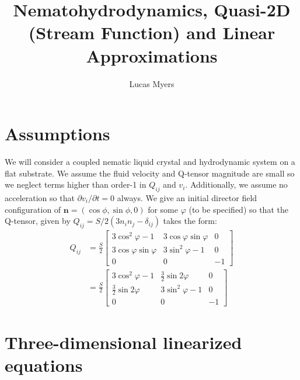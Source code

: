 \documentclass[reqno]{article}
\begin{document}
	\title{Nematohydrodynamics, Quasi-2D (Stream Function) and Linear Approximations}
	\author{Lucas Myers}
	\maketitle
	
	\section*{Assumptions}
	We will consider a coupled nematic liquid crystal and hydrodynamic system on a flat substrate. We assume the fluid velocity and Q-tensor magnitude are small so we neglect terms higher than order-1 in $Q_{ij}$ and $v_i$. Additionally, we assume no acceleration so that $\partial v_i/\partial t = 0$ always. We give an initial director field configuration of $\mathbf{n} = (\cos\phi, \sin\phi, 0)$ for some $\varphi$ (to be specified) so that the Q-tensor, given by $Q_{ij} = S/2(3n_i n_j - \delta_{ij})$ takes the form:
	\begin{align}
		Q_{ij} &= \frac{S}{2}\left[
			\begin{matrix}
				3\cos^2\varphi - 1 & 3\cos\varphi\sin\varphi & 0 \\
				3\cos\varphi\sin\varphi & 3\sin^2\varphi - 1 & 0 \\
				0 & 0 & -1
			\end{matrix}
		\right]\\
		&= \frac{S}{2}\left[
			\begin{matrix}
				3\cos^2\varphi - 1 & \frac{3}{2}\sin2\varphi & 0 \\
				\frac{3}{2}\sin2\varphi & 3\sin^2\varphi - 1 & 0 \\
				0 & 0 & -1
			\end{matrix}
		\right]
	\end{align}
	
	\section{Three-dimensional linearized equations}
	
\end{document}
